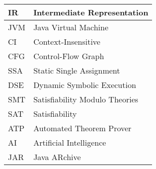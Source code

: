 \abbreviations
\begin{center}
	\renewcommand{\arraystretch}{1.5}
	\begin{longtable}{| l @{\qquad} | l |}
	\hline
	IR 			& Intermediate Representation 	\\ \hline
	JVM 		& Java Virtual Machine 			\\ \hline
  CI & Context-Insensitive \\ \hline
  CFG & Control-Flow Graph \\ \hline
  SSA & Static Single Assignment \\ \hline
  DSE & Dynamic Symbolic Execution \\ \hline
  SMT & Satisfiability Modulo Theories \\ \hline
  SAT & Satisfiability \\ \hline
  ATP & Automated Theorem Prover \\ \hline
  AI & Artificial Intelligence \\ \hline
  JAR & Java ARchive \\ \hline
	\end{longtable}
\end{center}
